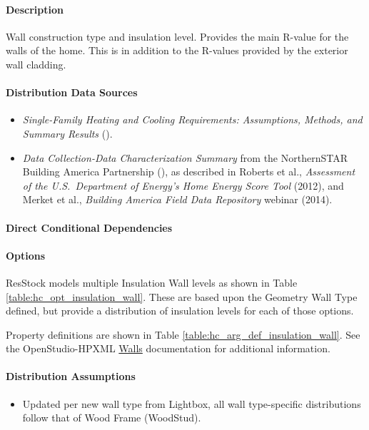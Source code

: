 \paragraph{Description}
% 
Wall construction type and insulation level. Provides the main R-value for the walls of the home. This is in addition to the R-values provided by the exterior wall cladding.

\paragraph{Distribution Data Sources}
% 
\begin{itemize}

\item
  \textit{Single-Family Heating and Cooling Requirements: Assumptions, Methods, and Summary Results} (\cite{Ritschard1992}).
\item

  \textit{Data Collection-Data Characterization Summary} from the NorthernSTAR Building America Partnership (\cite{Nettleton2012}), as described in
  Roberts et al., \textit{Assessment of the U.S.~Department of
  Energy's Home Energy Score Tool} (2012),
  and Merket et al., \textit{Building America Field Data Repository} webinar (2014).
\end{itemize}

\paragraph{Direct Conditional Dependencies}


\paragraph{Options}
ResStock models multiple Insulation Wall levels as shown in Table \ref{table:hc_opt_insulation_wall}. These are based upon the Geometry Wall Type defined, but provide a distribution of insulation levels for each of those options.



Property definitions are shown in Table \ref{table:hc_arg_def_insulation_wall}. See the OpenStudio-HPXML \href{https://openstudio-hpxml.readthedocs.io/en/v1.10.0/workflow_inputs.html#hpxml-walls}{Walls} documentation for additional information.



\paragraph{Distribution Assumptions}
% 
\begin{itemize}

\item
  Updated per new wall type from Lightbox, all wall type-specific
  distributions follow that of {Wood Frame} ({WoodStud}).
\end{itemize}
